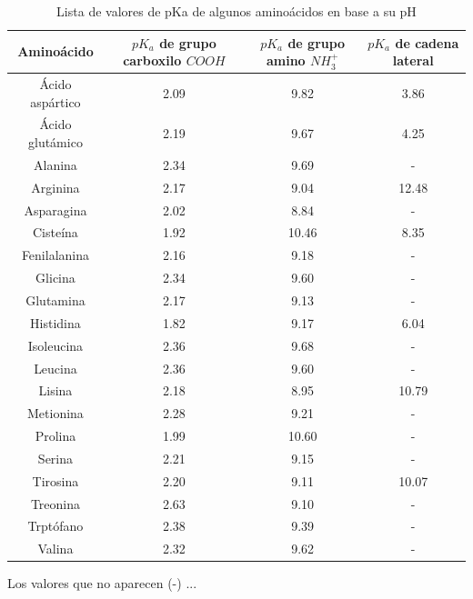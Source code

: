 \begin{table}
\centering
\caption{Lista de valores de pKa de algunos aminoácidos en base a su pH}
\label{tab:pka_aminoácidos}
\begin{threeparttable}
{
\begin{tabular}{cccc}\hline

    \textbf{Aminoácido} & \textbf{$pK_{a}$ de grupo carboxilo $COOH$} & \textbf{$pK_{a}$ de grupo amino $NH_{3}^{+}$} & $pK_{a}$ de cadena lateral\tnote{1} \\ \hline
    
    Ácido aspártico & 2.09 & 9.82 & 3.86 \\
    Ácido glutámico & 2.19 & 9.67 & 4.25 \\
    Alanina & 2.34 & 9.69 & - \\
    Arginina & 2.17 & 9.04 & 12.48 \\
    Asparagina & 2.02 & 8.84 & - \\
    Cisteína & 1.92 & 10.46 & 8.35 \\
    Fenilalanina & 2.16 & 9.18 & - \\
    Glicina & 2.34 & 9.60 & - \\
    Glutamina & 2.17 & 9.13 & - \\
    Histidina & 1.82 & 9.17 & 6.04 \\
    Isoleucina & 2.36 & 9.68 & - \\
    Leucina & 2.36 & 9.60 & - \\
    Lisina & 2.18 & 8.95 & 10.79 \\
    Metionina & 2.28 & 9.21 & - \\
    Prolina & 1.99 & 10.60 & - \\
    Serina & 2.21 & 9.15 & - \\
    Tirosina & 2.20 & 9.11 & 10.07 \\
    Treonina & 2.63 & 9.10 & - \\
    Trptófano & 2.38 & 9.39 & - \\
    Valina & 2.32 & 9.62 & - \\
    
    \hline
\end{tabular}
}
\begin{tablenotes} %
    \item[1] Los valores que no aparecen (-) ...
\end{tablenotes}
\end{threeparttable}
\end{table}